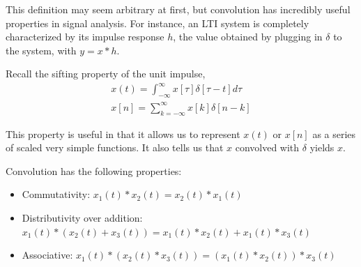 This definition may seem arbitrary at first, but convolution has
incredibly useful properties in signal analysis. For instance, an
LTI system is completely characterized by its impulse response $h$,
the value obtained by plugging in $\delta$ to the system, with
$y = x * h$.

Recall the sifting property of the unit impulse,
\begin{align}
    x(t) = \int_{-\infty}^{\infty} x[\tau] \delta[\tau - t] d\tau \\
    x[n] = \sum_{k=-\infty}^{\infty} x[k] \delta[n - k]
\end{align}

This property is useful in that it allows us to represent
$x(t)$ or $x[n]$ as a series of scaled very simple functions. It also
tells us that $x$ convolved with $\delta$ yields $x$.

Convolution has the following properties:
\begin{itemize}
    \item Commutativity: $x_1(t) * x_2(t) = x_2(t) * x_1(t)$
    \item Distributivity over addition:
          $x_1(t) * (x_2(t) + x_3(t)) = x_1(t)*x_2(t) + x_1(t)*x_3(t)$
    \item Associative: $x_1(t) * (x_2(t) * x_3(t)) = (x_1(t) * x_2(t)) * x_3(t)$
\end{itemize}